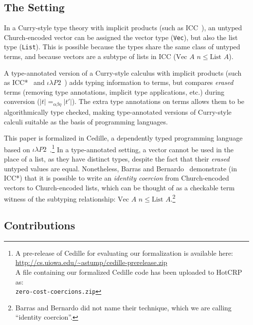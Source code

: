 \documentclass[a4paper,envcountsame,envcountsect]{llncs}
\newcommand{\earg}[1]{\,\,#1}
\newcommand{\subtp}[0]{\leq}
\newcommand{\cdle}[0]{\ensuremath{\iota \lambda P2}~}
\newcommand{\erase}[1]{\ensuremath{\lvert #1 \rvert}}
\newcommand{\name}[1]{\textrm{#1}}
\begin{document}
\subsection{The Setting}

In a Curry-style type theory with implicit
products (such as ICC~\cite{miquel:implicit}),
an untyped Church-encoded vector can be assigned
the vector type (\texttt{Vec}),
but also the list type (\texttt{List}).
This is possible because the types share the same class of untyped
terms, and because vectors are a subtype of lists in ICC
($\name{Vec} \earg A \earg n \subtp \name{List} \earg A$).

A type-annotated version of a Curry-style
calculus with implicit products
(such as ICC*~\cite{barras:implicit} and
\cdle\cite{stump17b}) adds typing information to terms, but compares
\textit{erased} terms (removing type annotations, implicit type
applications, etc.) during conversion
($\erase{t} =_{\alpha\beta\eta} \erase{t'}$).
The extra type annotations on terms allows them
to be algorithmically type checked, making type-annotated versions of
Curry-style calculi suitable as the basis of programming languages.

This paper is formalized in Cedille, a dependently typed programming
language based on \cdle.\footnote{\raggedright{A pre-release of Cedille for
evaluating our formalization is available here:\\
\url{http://cs.uiowa.edu/~astump/cedille-prerelease.zip}}\\
  A file containing our formalized Cedille code
  has been uploaded to HotCRP as:\\
  \texttt{zero-cost-coercions.zip}}
In a type-annotated setting, a vector cannot be used in
the place of a list, as they have distinct types, despite the fact that
their \textit{erased} untyped values are equal.
Nonetheless, Barras and Bernardo~\cite{barras:implicit} demonstrate
(in ICC*) that it is possible to write an \textit{identity coercion} from
Church-encoded vectors to Church-encoded lists, which can be thought
of as a checkable term witness of the subtyping relationship:
$\name{Vec} \earg A \earg n \subtp \name{List} \earg
A$.\footnote{Barras and Bernardo did not name their technique, which
  we are calling ``identity coercion''.
  }

\subsection{Contributions}
\end{document}
